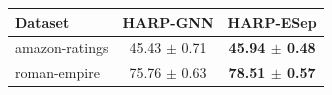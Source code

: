 \begin{tabular}{lcc}
\toprule
Dataset & HARP-GNN & HARP-ESep \\
\midrule
amazon-ratings & 45.43 $\pm$ 0.71 & \textbf{45.94 $\pm$ 0.48} \\
roman-empire & 75.76 $\pm$ 0.63 & \textbf{78.51 $\pm$ 0.57} \\
\bottomrule
\end{tabular}
